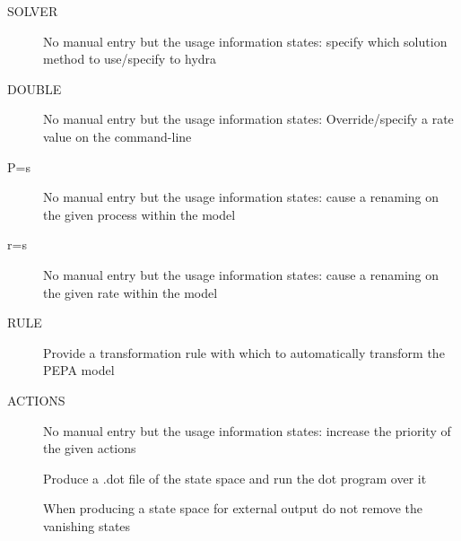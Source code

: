 \begin{description}
\item[ SOLVER]
No manual entry but the usage information states:
specify which solution method to use/specify to hydra
\end{description}

\begin{description}
\item[ DOUBLE]
No manual entry but the usage information states:
Override/specify a rate value on the command-line
\end{description}

\begin{description}
\item[ P=s]
No manual entry but the usage information states:
cause a renaming on the given process within the model
\end{description}

\begin{description}
\item[ r=s]
No manual entry but the usage information states:
cause a renaming on the given rate within the model
\end{description}

\begin{description}
\item[ RULE]
Provide a transformation rule with which
to automatically transform the PEPA model

\end{description}

\begin{description}
\item[ ACTIONS]
No manual entry but the usage information states:
increase the priority of the given actions
\end{description}

\begin{description}
\item[ ]
Produce a .dot file of the state space and run the dot program over it
\end{description}

\begin{description}
\item[ ]
When producing a state space for external output
do not remove the vanishing states

\end{description}

